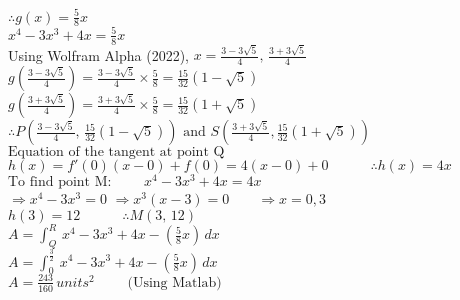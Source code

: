 \documentclass{homework}
\begin{document}
\begin{flushleft}
    $\therefore g(x)=\frac{5}{8}x$ \vspace{0.8em} \\
    $x^{4}-3x^{3}+4x=\frac{5}{8}x$ \vspace{0.8em} \\
    Using Wolfram Alpha (2022), $x = \frac{3- 3\sqrt{5}}{4}, \, \frac{3+3\sqrt{5}}{4}$ \vspace{0.8em} \\
    $g(\frac{3- 3\sqrt{5}}{4})=\frac{3- 3\sqrt{5}}{4}\times \frac{5}{8}=\frac{15}{32} (1 - \sqrt{5})$ \vspace{0.8em} \\
    $g(\frac{3+ 3\sqrt{5}}{4})=\frac{3+ 3\sqrt{5}}{4}\times \frac{5}{8}=\frac{15}{32} (1 +\sqrt{5})$ \vspace{0.8em} \\
    $\therefore P(\frac{3- 3\sqrt{5}}{4},\,\frac{15}{32} (1 - \sqrt{5})) \text{ and } S(\frac{3+ 3\sqrt{5}}{4},\frac{15}{32} (1 +\sqrt{5}))$ \vspace{1.8em} \\
    $\text{Equation of the tangent at point Q}$ \vspace{0.8em} \\
    $h(x)=f'(0)(x-0)+f(0)=4(x-0)+0 \hspace{3em} \therefore h(x)=4x$ \vspace{0.8em} \\
    $\text{To find point M: }\hspace{2em} x^4-3x^3+4x=4x$ \vspace{0.8em} \\
    $\Rightarrow x^4-3x^3=0$ \hspace{3em} $\Rightarrow x^3(x-3)=0 \hspace{2em} \Rightarrow x=0,3$ \vspace{0.8em} \\
    $h(3)=12 \hspace{3em} \therefore M(3,\, 12)$ \vspace{2.8em} \\
    $A=\int_Q^R \, x^4-3x^3+4x-(\frac{5}{8}x) \,dx$ \vspace{0.8em} \\
    $A=\int_0^{\frac{3}{2}} \, x^4-3x^3+4x-(\frac{5}{8}x) \,dx$ \vspace{0.8em} \\
    $A=\frac{243}{160}\, units^2 \hspace{2em} \text{ (Using Matlab)}$ \vspace{2.5em} \\

\end{flushleft}
\end{document}
